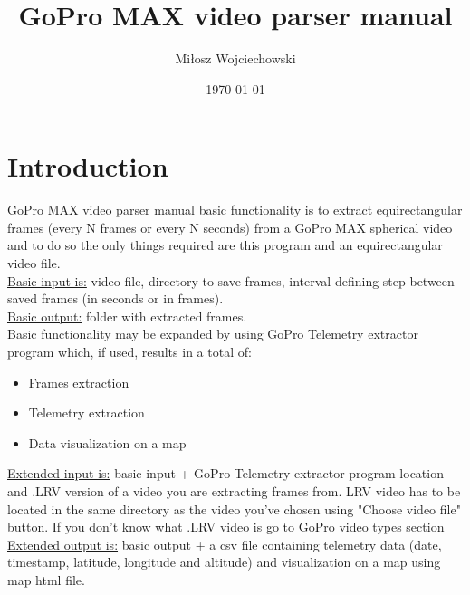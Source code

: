 \documentclass[a4paper,12pt]{book}
\begin{document}
\author{Miłosz Wojciechowski}
\title{GoPro MAX video parser manual}
\date{\today}


\maketitle
\pagebreak
{}
\renewcommand{\labelenumii}{\arabic{enumi}.\arabic{enumii}}
\tableofcontents
\chapter{Introduction}
GoPro MAX video parser manual basic functionality is to extract equirectangular frames (every N frames or every N seconds) from a GoPro MAX spherical video and to do so the only things required are this program and an equirectangular video file.\\

\underline{Basic input is:} video file, directory to save frames, interval defining step between saved frames (in seconds or in frames).\\

\underline{Basic output:} folder with extracted frames.\\

Basic functionality may be expanded by using GoPro Telemetry extractor program which, if used, results in a total of:
\begin{itemize}
	\item Frames extraction
	\item Telemetry extraction
	\item Data visualization on a map
\end{itemize}

\underline{Extended input is:} basic input + GoPro Telemetry extractor program location and .LRV version of a video you are extracting frames from. LRV video has to be located in the same directory as the video you've chosen using "Choose video file" button. If you don't know what .LRV video is go to \hyperref[sec:video]{GoPro video types section}\\

\underline{Extended output is:} basic output + a csv file containing telemetry data (date, timestamp, latitude, longitude and altitude) and visualization on a map using map html file.
\end{document}
